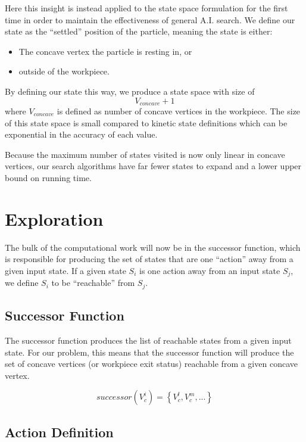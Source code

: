 Here this insight is instead applied to the state space formulation for the first time in order to maintain the effectiveness of general A.I. search. We define our state as the ``settled'' position of the particle, meaning the state is either:

\begin{itemize}
\item The concave vertex the particle is resting in, or
\item outside of the workpiece.
\end{itemize}

By defining our state this way, we produce a state space with size of
$$
V_{concave} + 1
$$
where $V_{concave}$ is defined as number of concave vertices in the workpiece. The size of this state space is small compared to kinetic state definitions which can be exponential in the accuracy of each value.

Because the maximum number of states visited is now only linear in concave vertices, our search algorithms have far fewer states to expand and a lower upper bound on running time.

\section{Exploration}

The bulk of the computational work will now be in the successor function, which is responsible for producing the set of states that are one ``action'' away from a given input state. If a given state $S_i$ is one action away from an input state $S_j$, we define $S_i$ to be ``reachable'' from $S_j$.

	\subsection{Successor Function}

The successor function produces the list of reachable states from a given input state. For our problem, this means that the successor function will produce the set of concave vertices (or workpiece exit status) reachable from a given concave vertex.

$$
successor(V_{c}^{i}) = \left \{ V_{c}^{l}, V_{c}^{m}, ...  \right \}
$$

	\subsection{Action Definition}

